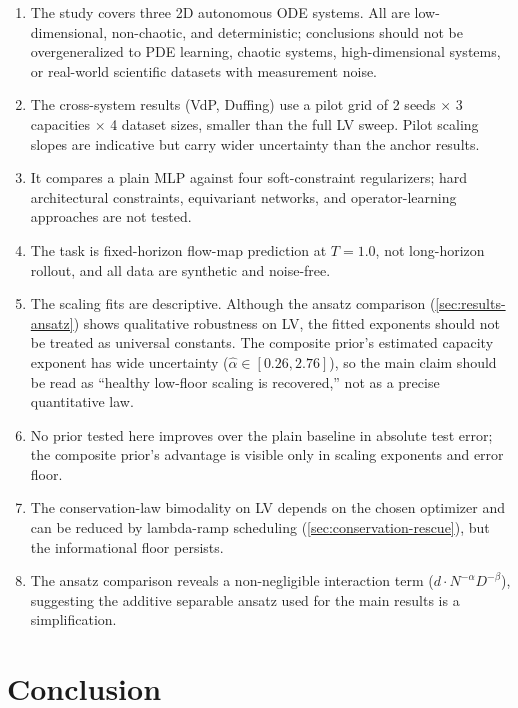 \documentclass[11pt]{article}
\begin{document}
\begin{enumerate}[leftmargin=*, itemsep=0.3em]
    \item The study covers three 2D autonomous ODE systems.
    All are low-dimensional, non-chaotic, and deterministic; conclusions should not be overgeneralized to PDE learning, chaotic systems, high-dimensional systems, or real-world scientific datasets with measurement noise.
    \item The cross-system results (VdP, Duffing) use a pilot grid of 2 seeds $\times$ 3 capacities $\times$ 4 dataset sizes, smaller than the full LV sweep.
    Pilot scaling slopes are indicative but carry wider uncertainty than the anchor results.
    \item It compares a plain MLP against four soft-constraint regularizers; hard architectural constraints, equivariant networks, and operator-learning approaches are not tested.
    \item The task is fixed-horizon flow-map prediction at $T = 1.0$, not long-horizon rollout, and all data are synthetic and noise-free.
    \item The scaling fits are descriptive.
    Although the ansatz comparison (\cref{sec:results-ansatz}) shows qualitative robustness on LV, the fitted exponents should not be treated as universal constants.
    The composite prior's estimated capacity exponent has wide uncertainty ($\hat{\alpha} \in [0.26, 2.76]$), so the main claim should be read as ``healthy low-floor scaling is recovered,'' not as a precise quantitative law.
    \item No prior tested here improves over the plain baseline in absolute test error; the composite prior's advantage is visible only in scaling exponents and error floor.
    \item The conservation-law bimodality on LV depends on the chosen optimizer and can be reduced by lambda-ramp scheduling (\cref{sec:conservation-rescue}), but the informational floor persists.
    \item The ansatz comparison reveals a non-negligible interaction term ($d \cdot N^{-\alpha}D^{-\beta}$), suggesting the additive separable ansatz used for the main results is a simplification.
\end{enumerate}

\section{Conclusion}
\end{document}
